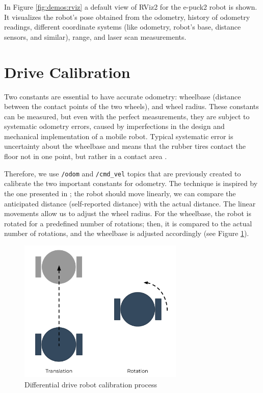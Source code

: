 In Figure \ref{fig:demos:rviz} a default view of RViz2 for the e-puck2 robot is shown.
It visualizes the robot's pose obtained from the odometry, history of odometry readings, different coordinate systems (like odometry, robot's base, distance sensors, and similar), range, and laser scan measurements.

\section{Drive Calibration}

Two constants are essential to have accurate odometry: wheelbase (distance between the contact points of the two wheels), and wheel radius.
These constants can be measured, but even with the perfect measurements, they are subject to systematic odometry errors, caused by imperfections in the design and mechanical implementation of a mobile robot.
Typical systematic error is uncertainty about the wheelbase and means that the rubber tires contact the floor not in one point, but rather in a contact area \cite{borenstein_measurement_1996}.

Therefore, we use \texttt{/odom} and \texttt{/cmd\_vel} topics that are previously created to calibrate the two important constants for odometry.
The technique is inspired by the one presented in \cite{borenstein_measurement_1996}; the robot should move linearly, we can compare the anticipated distance (self-reported distance) with the actual distance.
The linear movements allow us to adjust the wheel radius.
For the wheelbase, the robot is rotated for a predefined number of rotations; then, it is compared to the actual number of rotations, and the wheelbase is adjusted accordingly (see Figure \ref{fig:demos:diff_drive_calibration}).

\begin{figure}[H]
    \centering
    \includegraphics[width=0.7\textwidth]{demos/figures/calibration.pdf}
    \caption{Differential drive robot calibration process}
    \label{fig:demos:diff_drive_calibration}
\end{figure}

